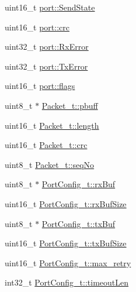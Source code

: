 \begin{DoxyCompactItemize}
\item 
uint16\-\_\-t \hyperlink{group___uploader_ga9eaf6bf50865d1b4f8470110523b9f6b}{port\-::\-Send\-State}
\item 
uint16\-\_\-t \hyperlink{group___uploader_ga6ad77d0d0cc02d7ce86e13041ef33c5e}{port\-::crc}
\item 
uint32\-\_\-t \hyperlink{group___uploader_ga6d92cd4c24b14264e16528a599123db4}{port\-::\-Rx\-Error}
\item 
uint32\-\_\-t \hyperlink{group___uploader_ga9b23351e935a17b3a216b903dabac29c}{port\-::\-Tx\-Error}
\item 
uint16\-\_\-t \hyperlink{group___uploader_gae9ceccbaac142c00a4699e9020d27f4b}{port\-::flags}
\item 
uint8\-\_\-t $\ast$ \hyperlink{group___uploader_ga9e944ebc8efdc543601a3ba9ed2fa36d}{\-Packet\-\_\-t\-::pbuff}
\item 
uint16\-\_\-t \hyperlink{group___uploader_ga0913fea37a151d66203855de5adfe013}{\-Packet\-\_\-t\-::length}
\item 
uint16\-\_\-t \hyperlink{group___uploader_gacdbb361acbb12c670984915ffd83f70e}{\-Packet\-\_\-t\-::crc}
\item 
uint8\-\_\-t \hyperlink{group___uploader_ga9f51d41b7233025b207d9a47188a684b}{\-Packet\-\_\-t\-::seq\-No}
\item 
uint8\-\_\-t $\ast$ \hyperlink{group___uploader_ga351151bd718bd34e6b4acc0c33a315a1}{\-Port\-Config\-\_\-t\-::rx\-Buf}
\item 
uint16\-\_\-t \hyperlink{group___uploader_ga2f1cf7a3eabee4b4fa51aeedb4e7f708}{\-Port\-Config\-\_\-t\-::rx\-Buf\-Size}
\item 
uint8\-\_\-t $\ast$ \hyperlink{group___uploader_ga45f87f2e2a856d459c590f5a1a0ffeb4}{\-Port\-Config\-\_\-t\-::tx\-Buf}
\item 
uint16\-\_\-t \hyperlink{group___uploader_gacc8a53158605f7a72f895d2a80036137}{\-Port\-Config\-\_\-t\-::tx\-Buf\-Size}
\item 
uint16\-\_\-t \hyperlink{group___uploader_ga780cb1cf13c87035b0715a39dec4981b}{\-Port\-Config\-\_\-t\-::max\-\_\-retry}
\item 
int32\-\_\-t \hyperlink{group___uploader_ga13c21abf5c985cf8f33e4a6ccc45310f}{\-Port\-Config\-\_\-t\-::timeout\-Len}
\end{DoxyCompactItemize}
